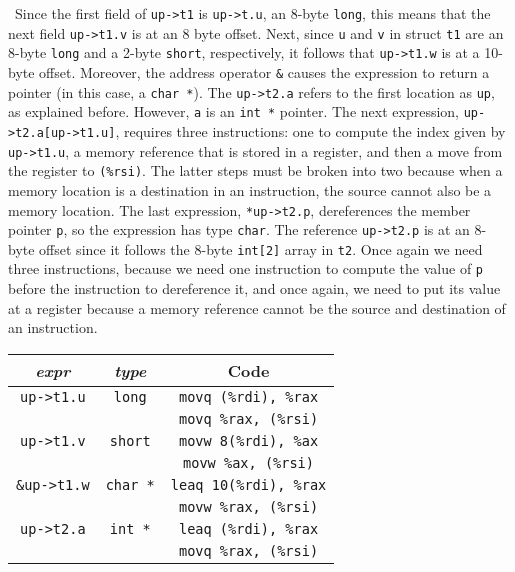 \documentclass[12pt]{article}
\newenvironment{sol}[1][Solution]{\begin{trivlist}
		\item[\hskip \labelsep {\bfseries #1:}]}{\end{trivlist}}
\begin{document}
{\begin{sol}
	\
	Since the first field of \texttt{up->t1} is \texttt{up->t.u}, an 8-byte \texttt{long},
	this means that the next field \texttt{up->t1.v} is at an 8 byte offset. Next,
	since \texttt{u} and \texttt{v} in struct \texttt{t1} are an 8-byte \texttt{long} and
	a 2-byte \texttt{short}, respectively, it follows that \texttt{up->t1.w} is at a 10-byte
	offset. Moreover, the address operator \texttt{\&} causes the expression to return
	a pointer (in this case, a \texttt{char *}). The \texttt{up->t2.a} refers to the first location as \texttt{up}, as explained before. However, \texttt{a} is an \texttt{int *} pointer.
	The next expression, \texttt{up->t2.a[up->t1.u]}, requires
	three instructions: one to compute the index given by \texttt{up->t1.u}, a memory reference
	that is stored in a register, and then a move from the register to \texttt{(\%rsi)}.
	The latter steps must be broken into two because when a memory location is a destination in 
	an instruction, the source cannot also be a memory location. The last expression,
	\texttt{*up->t2.p}, dereferences the member pointer \texttt{p}, so the expression
	has type \texttt{char}. The reference \texttt{up->t2.p} is at an 8-byte offset since
	it follows the 8-byte \texttt{int[2]} array in \texttt{t2}. Once again we need three instructions,
	because we need one instruction to compute the value of \texttt{p} before the instruction to
	dereference it, and once again, we need to put its value at a register because a
	memory reference cannot be the source and destination of an instruction.
	\begin{center}
		\begin{tabular}{ccc}
			\emph{expr} & \emph{type} & Code\\
			\hline
			\texttt{up->t1.u} & \texttt{long} & \texttt{movq (\%rdi), \%rax}\\
			{} & {} & \texttt{movq \%rax, (\%rsi)}\\
			
			\texttt{up->t1.v} & \texttt{short} & \texttt{movw 8(\%rdi), \%ax} \\
			{} & {} & \texttt{movw \%ax, (\%rsi)}\\
			
			\texttt{\&up->t1.w} & \texttt{char *} & \texttt{leaq 10(\%rdi), \%rax} \\
			{} & {} & \texttt{movw \%rax, (\%rsi)}\\
			
			\texttt{up->t2.a} & \texttt{int *} & \texttt{leaq (\%rdi), \%rax}\\
			{} & {} & \texttt{movq \%rax, (\%rsi)}\\
			

\end{tabular}
\end{center}
\end{sol}}
\end{document}
